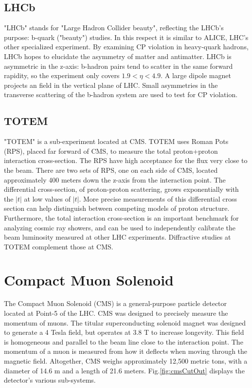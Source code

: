 \subsection{LHCb}

"LHCb" stands for "Large Hadron Collider beauty", reflecting the LHCb's purpose: b-quark ("beauty") studies. In this respect it is similar to ALICE, LHC's other specialized experiment. By examining CP violation in heavy-quark hadrons, LHCb hopes to elucidate the asymmetry of matter and antimatter. LHCb is asymmetric in the z-axis: b-hadron pairs tend to scatter in the same forward rapidity, so the experiment only covers $1.9<\eta<4.9$. A large dipole magnet projects an field in the vertical plane of LHC. Small asymmetries in the transverse scattering of the b-hadron system are used to test for CP violation. 

\subsection{TOTEM}

"TOTEM" is a sub-experiment located at CMS. TOTEM uses Roman Pots (RPS), placed far forward of CMS, to measure the total proton+proton interaction cross-section. The RPS have high acceptance for the flux very close to the beam. There are two sets of RPS, one on each side of CMS, located approximately 400 meters down the z-axis from the interaction point. The differential cross-section, of proton-proton scattering, grows exponentially with the $|t|$ at low values of $|t|$. More precise measurements of this differential cross section can help distinguish between competing models of proton structure. Furthermore, the total interaction cross-section is an important benchmark for analyzing cosmic ray showers, and can be used to independently calibrate the beam luminosity measured at other LHC experiments. Diffractive studies at TOTEM complement those at CMS.

\section{Compact Muon Solenoid}

The Compact Muon Solenoid (CMS) is a general-purpose particle detector located at Point-5 of the LHC. CMS was designed to precisely measure the momentum of muons. The titular superconducting solenoid magnet was designed to generate a 4 Tesla field, but operates at 3.8 T to increase longevity. This field is homogeneous and parallel to the beam line close to the interaction point. The momentum of a muon is measured from how it deflects when moving through the magnetic field. Altogether, CMS weighs approximately 12,500 metric tons, with a diameter of 14.6 m and a length of 21.6 meters. Fig.\ref{fig:cmsCutOut} displays the detector's various sub-systems. 

